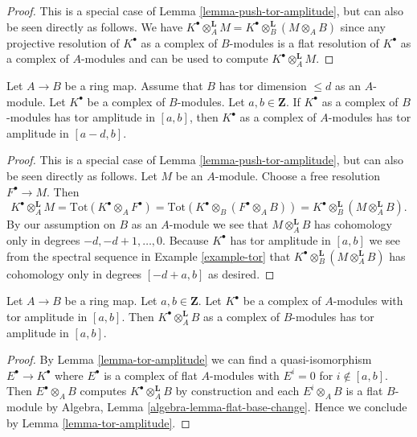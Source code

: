 \begin{proof}
This is a special case of Lemma \ref{lemma-push-tor-amplitude}, but can also
be seen directly as follows. We have
$K^\bullet \otimes_A^{\mathbf{L}} M =
K^\bullet \otimes_B^{\mathbf{L}} (M \otimes_A B)$
since any projective resolution of $K^\bullet$ as a complex of $B$-modules
is a flat resolution of $K^\bullet$ as a complex of $A$-modules and
can be used to compute $K^\bullet \otimes_A^{\mathbf{L}} M$.
\end{proof}

\begin{lemma}
\label{lemma-finite-tor-dimension-push-tor-amplitude}
Let $A \to B$ be a ring map. Assume that $B$ has tor dimension $\leq d$
as an $A$-module. Let $K^\bullet$ be a complex of $B$-modules.
Let $a, b \in \mathbf{Z}$. If $K^\bullet$ as a complex of $B$-modules
has tor amplitude in $[a, b]$, then $K^\bullet$ as a complex of
$A$-modules has tor amplitude in $[a - d, b]$.
\end{lemma}

\begin{proof}
This is a special case of Lemma \ref{lemma-push-tor-amplitude}, but can also
be seen directly as follows.
Let $M$ be an $A$-module. Choose a free resolution $F^\bullet \to M$.
Then
$$
K^\bullet \otimes_A^{\mathbf{L}} M =
\text{Tot}(K^\bullet \otimes_A F^\bullet) =
\text{Tot}(K^\bullet \otimes_B (F^\bullet \otimes_A B)) =
K^\bullet \otimes_B^{\mathbf{L}} (M \otimes_A^{\mathbf{L}} B).
$$
By our assumption on $B$ as an $A$-module we see that
$M \otimes_A^{\mathbf{L}} B$ has cohomology only in degrees
$-d, -d + 1, \ldots, 0$. Because $K^\bullet$ has tor amplitude in
$[a, b]$ we see from the spectral sequence in
Example \ref{example-tor}
that $K^\bullet \otimes_B^{\mathbf{L}} (M \otimes_A^{\mathbf{L}} B)$
has cohomology only in degrees $[-d + a, b]$ as desired.
\end{proof}

\begin{lemma}
\label{lemma-pull-tor-amplitude}
Let $A \to B$ be a ring map.
Let $a, b \in \mathbf{Z}$.
Let $K^\bullet$ be a complex of $A$-modules with tor amplitude in $[a, b]$.
Then $K^\bullet \otimes_A^{\mathbf{L}} B$ as a complex of $B$-modules
has tor amplitude in $[a, b]$.
\end{lemma}

\begin{proof}
By
Lemma \ref{lemma-tor-amplitude}
we can find a quasi-isomorphism $E^\bullet \to K^\bullet$ where
$E^\bullet$ is a complex of flat $A$-modules with $E^i = 0$ for
$i \not \in [a, b]$. Then $E^\bullet \otimes_A B$ computes
$K^\bullet \otimes_A ^{\mathbf{L}} B$ by construction and
each $E^i \otimes_A B$ is a flat $B$-module by
Algebra, Lemma \ref{algebra-lemma-flat-base-change}.
Hence we conclude by
Lemma \ref{lemma-tor-amplitude}.
\end{proof}

